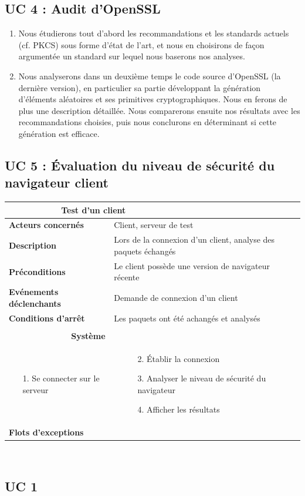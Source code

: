 \documentclass[a4paper,11pt,french]{article}
\newcommand{\fiche}[9] {
	\noindent
\begin{tabular}{|p{4cm}| p{2cm} | p{4cm} | p{.5cm} | p{7cm}|} 
\hline
\rowcolor{blue}
\multicolumn{2}{|l|}{\color{white}\bfseries{Nom}} & \multicolumn{3}{l|}{\color{white}\bfseries{#1}}\\
\hline
\multicolumn{2}{|l|}{\bfseries{Acteurs concernés}} & \multicolumn{3}{m{10.5cm}|}{#2}\\
\hline
\multicolumn{2}{|l|}{\bfseries{Description}} & \multicolumn{3}{m{10.5cm}|}{#3}\\
\hline
\multicolumn{2}{|l|}{\bfseries{Préconditions}} & \multicolumn{3}{m{10.5cm}|}{#4}\\
\hline
\multicolumn{2}{|l|}{\bfseries{Evénements déclenchants}} & \multicolumn{3}{m{10.5cm}|}{#5}\\
\hline
\multicolumn{2}{|l|}{\bfseries{Conditions d'arrêt}} & \multicolumn{3}{m{10.5cm}|}{#6}\\
\hline
\rowcolor{gray}
\multicolumn{5}{|c|}{\bfseries{Description du flot d'événements principal}}\\
\hline
\rowcolor{gray}
\multicolumn{3}{|c|}{\bfseries{Acteur(s)}} & \multicolumn{2}{c|}{\bfseries{Système}}\\
\hline
\multicolumn{3}{|p{7.5cm}|}{#7} & \multicolumn{2}{p{7.5cm}|}{#8}\\
\hline
\multicolumn{2}{|l}{\bfseries{Flots d'exceptions}} & \multicolumn{3}{|p{11.5cm}|}{#9}\\
\hline
\end{tabular}
\\
}
\begin{document}
\subsection{UC 4 : Audit d'OpenSSL}
\begin{enumerate}
 	\item Nous étudierons tout d'abord les recommandations et les standards actuels (cf. PKCS) sous forme d'état de l'art, et nous en choisirons de façon argumentée un standard sur lequel nous baserons nos analyses.
	\item Nous analyserons dans un deuxième temps le code source d'OpenSSL (la dernière version), en particulier sa partie développant la génération d'éléments aléatoires et ses primitives cryptographiques. Nous en ferons de plus une description détaillée. Nous comparerons ensuite nos résultats avec les recommandations choisies, puis nous conclurons en déterminant si cette génération est efficace.
\end{enumerate}


\subsection{UC 5 : Évaluation du niveau de sécurité du navigateur client}
\fiche
	{Test d'un client} %
	{Client, serveur de test} %
	{Lors de la connexion d'un client, analyse des paquets échangés} %
	{Le client possède une version de navigateur récente} %
	{Demande de connexion d'un client} %
	{Les paquets ont été achangés et analysés} %
	{\begin{itemize}  %
		\item [1. ] Se connecter sur le serveur
		\item [] 
		\item [] 
	 \end{itemize}
	} 
	{\begin{itemize}  %
		\item []
		\item [2. ] Établir la connexion
		\item [3. ] Analyser le niveau de sécurité du navigateur
		\item [4. ] Afficher les résultats
	\end{itemize}
	 }
	{} %

\subsection{UC 1}
\end{document}
